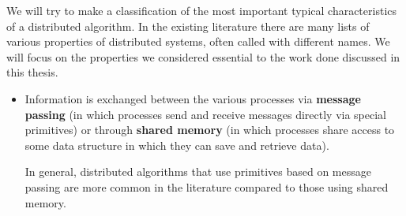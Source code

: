 We will try to make a classification of the most important typical characteristics of a distributed algorithm. In the existing literature there are many lists of various properties of distributed systems, often called with different names.
We will focus on the properties we considered essential to the work done discussed in this thesis.


\begin{itemize}
	\item Information is exchanged between the various processes via \textbf{message passing} (in which processes send and receive messages directly via special primitives) or through \textbf{shared memory} (in which processes share access to some data structure in which they can save and retrieve data).
	
	
	In general, distributed algorithms that use primitives based on message passing are more common in the literature compared to those using shared memory.
\end{itemize}





